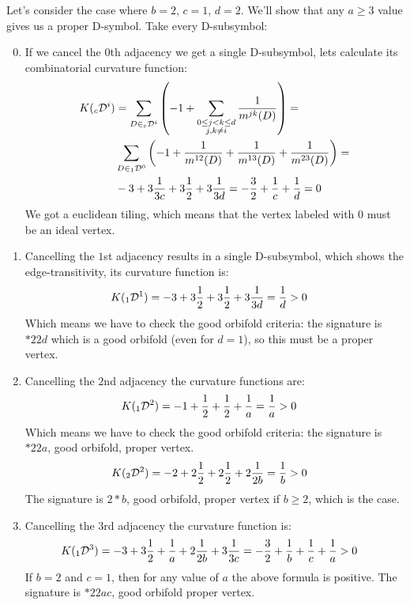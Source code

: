\documentclass[12pt,a4paper]{article}
\numberwithin{equation}{section}
\newcommand{\leftsub}[2]{{\vphantom{#2}}_{#1}{#2}}
\theoremstyle{plain}%
\theoremstyle{definition}
\theoremstyle{remark}
\begin{document}
Let's consider the case where $b=2$, $c=1$, $d=2$. We'll show that any $a\geq3$ value
gives us a proper D-symbol. Take every D-subsymbol:
\begin{enumerate}
  \setcounter{enumi}{-1}
  \item If we cancel the $0$th adjacency we get a single D-subsymbol, lets
    calculate its combinatorial curvature function:
    \begin{align*}
      K(\leftsub{c}{\mathcal{D}^i})&=\sum_{D\in
      \leftsub{c}{\mathcal{D}^i}}\left(-1+\sum_{\substack{0\le j<k\le d \\ j,k\ne i}}\frac{1}{m^{jk}(D)}\right)= \\
      &
      \sum_{D\in\leftsub{1}{\mathcal{D}^0}}\left(-1+\frac{1}{m^{12}(D)}+\frac{1}{m^{13}(D)}+\frac{1}{m^{23}(D)}\right)= \\
      & -3 + 3\frac{1}{3c} + 3\frac{1}{2} + 3\frac{1}{3d} = -\frac{3}{2}+\frac{1}{c}+\frac{1}{d} = 0
    \end{align*}
    We got a euclidean tiling, which means that the vertex labeled with $0$ must
    be an ideal vertex.
  \item Cancelling the $1$st adjacency results in a single D-subsymbol, which
    shows the edge-transitivity, its curvature function is:
    \begin{align*}
      K(\leftsub{1}{\mathcal{D}^1})&= -3 + 3\frac{1}{2} + 3\frac{1}{2} +
      3\frac{1}{3d} = \frac{1}{d} > 0
    \end{align*}
    Which means we have to check the good orbifold criteria: the signature is
    $*22d$ which is a good orbifold (even for $d=1$), so this must be a proper vertex.
  \item Cancelling the $2$nd adjacency the curvature functions are:
    \begin{align*}
      K(\leftsub{1}{\mathcal{D}^2})&= -1 + \frac{1}{2} + \frac{1}{2} +
      \frac{1}{a} = \frac{1}{a} > 0
    \end{align*}
    Which means we have to check the good orbifold criteria: the signature is
    $*22a$, good orbifold, proper vertex.
    \begin{align*}
      K(\leftsub{2}{\mathcal{D}^2})&= -2 + 2\frac{1}{2} + 2\frac{1}{2} +
      2\frac{1}{2b} = \frac{1}{b} > 0
    \end{align*}
    The signature is $2*b$, good orbifold, proper vertex if $b\geq2$, which is
    the case.
  \item Cancelling the $3$rd adjacency the curvature function is:
    \begin{align*}
      K(\leftsub{1}{\mathcal{D}^3})&= -3 + 3\frac{1}{2} + \frac{1}{a} +
      2\frac{1}{2b} + 3\frac{1}{3c} =
       -\frac{3}{2} + \frac{1}{b} + \frac{1}{c} + \frac{1}{a} > 0
    \end{align*}
    If $b=2$ and $c=1$, then for any value of $a$ the above formula is positive.
    The signature is $*22ac$, good orbifold proper vertex.
\end{enumerate}
\end{document}
